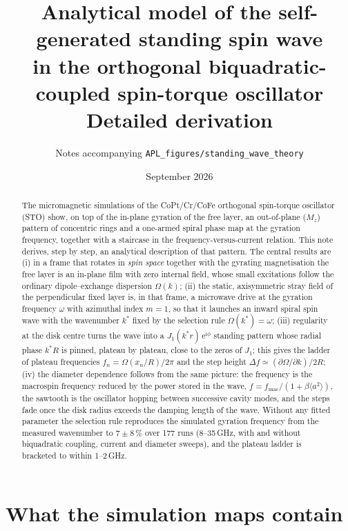 \documentclass[11pt,a4paper]{article}
\title{Analytical model of the self-generated standing spin wave\\
in the orthogonal biquadratic-coupled spin-torque oscillator\\[4pt]
\large Detailed derivation}
\author{Notes accompanying \texttt{APL\_figures/standing\_wave\_theory}}
\date{September 2026}
\newcommand{\ee}{\mathrm{e}}
\newcommand{\ii}{\mathrm{i}}
\begin{document}
\maketitle

\begin{abstract}
The micromagnetic simulations of the CoPt/Cr/CoFe orthogonal spin-torque oscillator (STO) show, on top of the
in-plane gyration of the free layer, an out-of-plane ($M_z$) pattern of concentric rings and a one-armed spiral
phase map at the gyration frequency, together with a staircase in the frequency-versus-current relation.
This note derives, step by step, an analytical description of that pattern.  The central results are
(i) in a frame that rotates in \emph{spin space} together with the gyrating magnetisation the free layer is an
in-plane film with zero internal field, whose small excitations follow the ordinary dipole--exchange dispersion
$\Omega(k)$; (ii) the static, axisymmetric stray field of the perpendicular fixed layer is, in that frame, a
microwave drive at the gyration frequency $\omega$ with azimuthal index $m=1$, so that it launches an inward
spiral spin wave with the wavenumber $k^\ast$ fixed by the selection rule $\Omega(k^\ast)=\omega$;
(iii) regularity at the disk centre turns the wave into a $J_1(k^\ast r)\,\ee^{\ii\phi}$ standing pattern whose
radial phase $k^\ast R$ is pinned, plateau by plateau, close to the zeros of $J_1$; this gives the ladder of plateau
frequencies $f_n=\Omega(x_n/R)/2\pi$ and the step height $\Delta f\simeq(\partial\Omega/\partial k)/2R$;
(iv) the diameter dependence follows from the same picture: the frequency is the macrospin frequency reduced by
the power stored in the wave, $f=f_\mathrm{mac}/(1+\beta\langle a^2\rangle)$, the sawtooth is the oscillator hopping
between successive cavity modes, and the steps fade once the disk radius exceeds the damping length of the wave.
Without any fitted parameter the selection rule reproduces the simulated gyration frequency from the measured
wavenumber to $7\pm8\,\%$ over 177 runs (8--35\,GHz, with and without biquadratic coupling, current and diameter
sweeps), and the plateau ladder is bracketed to within 1--2\,GHz.
\end{abstract}

\tableofcontents

\section{What the simulation maps contain}
\label{sec:maps}
\end{document}
